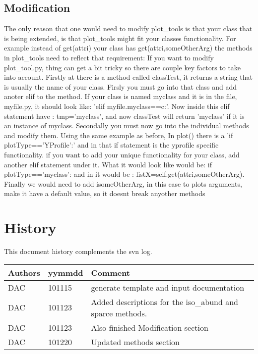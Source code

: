 \subsection{Modification}
The only reason that one would need to modify plot\_tools is that your class that is being extended, is that plot\_tools might fit your classes functionality.  For example
instead of get(attri) your class has get(attri,someOtherArg) the methods in plot\_tools need to reflect that requirement:
If you want to modify plot\_tool.py, thing can get a bit tricky so there are couple key factors to take into account.
Firstly at there is a method called classTest, it returns a string that is usually the name of your class.  Firsly you must go into that class
and add anoter elif to the method.  If your class is named myclass and it is in the file, myfile.py, it should look like: 
'elif myfile.myclass==c:'. Now inside this elif statement have : tmp='myclass', and now classTest will return 'myclass' if it is 
an instance of myclass.\newline
Secondally you must now go into the individual methods and modify them.  Using the same example as before,
In plot() there is a 'if plotType=='YProfile':' and in that if statement is the yprofile specific functionality. 
if you want to add your unique functionality for your class, add another elif statement under it.
What it would look like would be: if plotType=='myclass': and in it would be : listX=self.get(attri,someOtherArg).\newline
Finally we would need to add isomeOtherArg, in this case to plots arguments, make it have a default value, so it doesnt break anyother methods

\section{History} 
This document history complements the svn log.

\begin{tabular*}{\textwidth}{lll}
\hline
Authors & yymmdd & Comment \\
\hline
DAC & 101115 & generate template and input documentation\\
DAC & 101123 & Added descriptions for the iso\_abund and sparce methods.\\
DAC & 101123 & Also finished Modification section\\
DAC & 101220 & Updated methods section\\
\hline
\end{tabular*}
